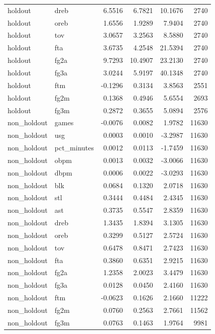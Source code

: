 \begin{table}
\begin{tabular}{llrrrr}
holdout & dreb & 6.5516 & 6.7821 & 10.1676 & 2740 \\
holdout & oreb & 1.6556 & 1.9289 & 7.9404 & 2740 \\
holdout & tov & 3.0657 & 3.2563 & 8.5880 & 2740 \\
holdout & fta & 3.6735 & 4.2548 & 21.5394 & 2740 \\
holdout & fg2a & 9.7293 & 10.4907 & 23.2130 & 2740 \\
holdout & fg3a & 3.0244 & 5.9197 & 40.1348 & 2740 \\
holdout & ftm & -0.1296 & 0.3134 & 3.8563 & 2551 \\
holdout & fg2m & 0.1368 & 0.4946 & 5.6554 & 2693 \\
holdout & fg3m & 0.2872 & 0.3655 & 5.0894 & 2576 \\
non\_holdout & games & -0.0076 & 0.0082 & 1.9782 & 11630 \\
non\_holdout & usg & 0.0003 & 0.0010 & -3.2987 & 11630 \\
non\_holdout & pct\_minutes & 0.0012 & 0.0113 & -1.7459 & 11630 \\
non\_holdout & obpm & 0.0013 & 0.0032 & -3.0066 & 11630 \\
non\_holdout & dbpm & 0.0006 & 0.0022 & -3.0293 & 11630 \\
non\_holdout & blk & 0.0684 & 0.1320 & 2.0718 & 11630 \\
non\_holdout & stl & 0.3444 & 0.4484 & 2.4345 & 11630 \\
non\_holdout & ast & 0.3735 & 0.5547 & 2.8359 & 11630 \\
non\_holdout & dreb & 1.3435 & 1.8394 & 3.1305 & 11630 \\
non\_holdout & oreb & 0.3299 & 0.5127 & 2.5724 & 11630 \\
non\_holdout & tov & 0.6478 & 0.8471 & 2.7423 & 11630 \\
non\_holdout & fta & 0.3860 & 0.6351 & 2.9215 & 11630 \\
non\_holdout & fg2a & 1.2358 & 2.0023 & 3.4479 & 11630 \\
non\_holdout & fg3a & 0.0128 & 0.0450 & 2.4160 & 11630 \\
non\_holdout & ftm & -0.0623 & 0.1626 & 2.1660 & 11222 \\
non\_holdout & fg2m & 0.0760 & 0.2563 & 2.7661 & 11562 \\
non\_holdout & fg3m & 0.0763 & 0.1463 & 1.9764 & 9981 \\
\bottomrule
\end{tabular}
\end{table}
